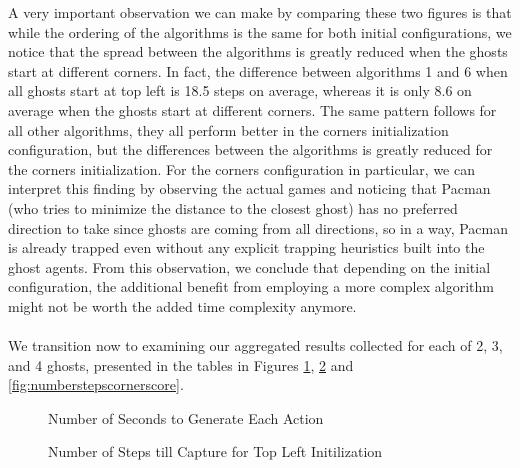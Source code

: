 \documentclass[11pt]{article}
\begin{document}
A very important observation we can make by comparing these two figures is that while the ordering of the algorithms is the same for both initial configurations, we notice that the spread between the algorithms is greatly reduced when the ghosts start at different corners. In fact, the difference between algorithms 1 and 6 when all ghosts start at top left is 18.5 steps on average, whereas it is only 8.6 on average when the ghosts start at different corners. The same pattern follows for all other algorithms, they all perform better in the corners initialization configuration, but the differences between the algorithms is greatly reduced for the corners initialization. For the corners configuration in particular, we can interpret this finding by observing the actual games and noticing that Pacman (who tries to minimize the distance to the closest ghost) has no preferred direction to take since ghosts are coming from all directions, so in a way, Pacman is already trapped even without any explicit trapping heuristics built into the ghost agents. From this observation, we conclude that depending on the initial configuration, the additional benefit from employing a more complex algorithm might not be worth the added time complexity anymore.\\\\

We transition now to examining our aggregated results collected for each of 2, 3, and 4 ghosts, presented in the tables in Figures \ref{fig:numsecondsaction}, \ref{fig:numsecondinitialization} and \ref{fig:numberstepscornerscore}. 


\begin{figure}[H]
	\caption{Number of Seconds to Generate Each Action}
	\label{fig:numsecondsaction}
\end{figure}

\begin{figure}[H]
	\caption{Number of Steps till Capture for Top Left Initilization}
	\label{fig:numsecondinitialization}
\end{figure}
\end{document}
